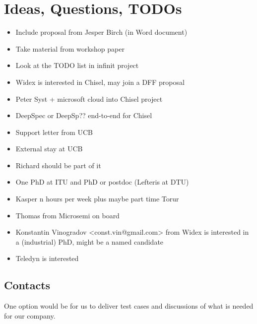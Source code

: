\documentclass[fleqn,12pt]{article}
\begin{document}

\newpage
\small

%


\newpage

\section{Ideas, Questions, TODOs}



\begin{itemize}
\item Include proposal from Jesper Birch (in Word document)
\item Take material from workshop paper
\item Look at the TODO list in infinit project
\item Widex is interested in Chisel, may join a DFF proposal
\item Peter Syst + microsoft cloud into Chisel project
\item DeepSpec or DeepSp?? end-to-end for Chisel
\item Support letter from UCB
\item External stay at UCB
\item Richard should be part of it
\item One PhD at ITU and PhD or postdoc (Lefteris at DTU)
\item Kasper n hours per week plus maybe part time Torur
\item Thomas from Microsemi on board
\item Konstantin Vinogradov <const.vin@gmail.com> from Widex is interested in a (industrial) PhD, might be a named candidate
\item Teledyn is interested
\end{itemize}

\subsection{Contacts}

%
%
%
%


One option would be for us to deliver test cases and discussions of what is needed for our company. 
\end{document}
